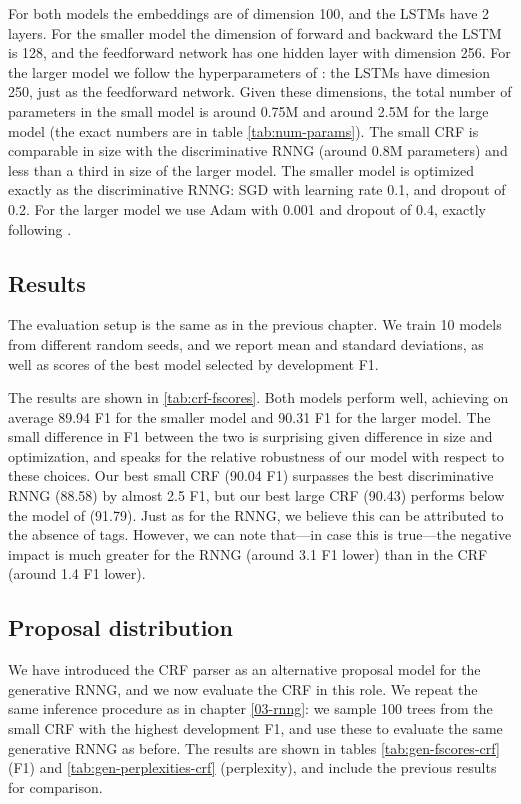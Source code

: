    For both models the embeddings are of dimension 100, and the LSTMs have 2 layers. For the smaller model the dimension of forward and backward the LSTM is 128, and the feedforward network has one hidden layer with dimension 256. For the larger model we follow the hyperparameters of \citet{stern2017minimal}: the LSTMs have dimesion 250, just as the feedforward network. Given these dimensions, the total number of parameters in the small model is around 0.75M and around 2.5M for the large model (the exact numbers are in table \ref{tab:num-params}). The small CRF is comparable in size with the discriminative RNNG (around 0.8M parameters) and less than a third in size of the larger model. The smaller model is optimized exactly as the discriminative RNNG: SGD with learning rate 0.1, and dropout of 0.2. For the larger model we use Adam \citep{kingma2014adam} with 0.001 and dropout of 0.4, exactly following \citet{stern2017minimal}.

  \subsection{Results}
    The evaluation setup is the same as in the previous chapter. We train 10 models from different random seeds, and we report mean and standard deviations, as well as scores of the best model selected by development F1.

    

    The results are shown in \ref{tab:crf-fscores}. Both models perform well, achieving on average 89.94 F1 for the smaller model and 90.31 F1 for the larger model. The small difference in F1 between the two is surprising given difference in size and optimization, and speaks for the relative robustness of our model with respect to these choices. Our best small CRF (90.04 F1) surpasses the best discriminative RNNG (88.58) by almost 2.5 F1, but our best large CRF (90.43) performs below the model of \citet{stern2017minimal} (91.79). Just as for the RNNG, we believe this can be attributed to the absence of tags. However, we can note that---in case this is true---the negative impact is much greater for the RNNG (around 3.1 F1 lower) than in the CRF (around 1.4 F1 lower).

  \subsection{Proposal distribution}
    We have introduced the CRF parser as an alternative proposal model for the generative RNNG, and we now evaluate the CRF in this role. We repeat the same inference procedure as in chapter \ref{03-rnng}: we sample 100 trees from the small CRF with the highest development F1, and use these to evaluate the same generative RNNG as before. The results are shown in tables \ref{tab:gen-fscores-crf} (F1) and \ref{tab:gen-perplexities-crf} (perplexity), and include the previous results for comparison.


